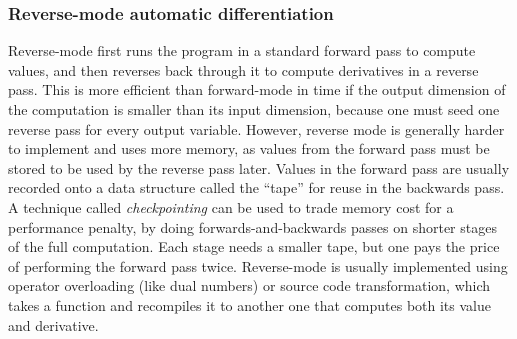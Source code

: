 \documentclass{aa}
\begin{document}
\subsubsection{Reverse-mode automatic differentiation}

Reverse-mode first runs the program in a standard forward pass to compute values, and then reverses back through it to compute derivatives in a reverse pass.
This is more efficient than forward-mode in time if the output dimension of the computation is smaller than its input dimension, because one must seed one reverse pass for every output variable.
However, reverse mode is generally harder to implement and uses more memory, as values from the forward pass must be stored to be used by the reverse pass later. 
Values in the forward pass are usually recorded onto a data structure called the \enquote{tape} for reuse in the backwards pass.
A technique called \textit{checkpointing} can be used to trade memory cost for a performance penalty, by doing forwards-and-backwards passes on shorter stages of the full computation.
Each stage needs a smaller tape, but one pays the price of performing the forward pass twice.
Reverse-mode is usually implemented using operator overloading (like dual numbers) or source code transformation, which takes a function and recompiles it to another one that computes both its value and derivative.
\fi
\end{document}
